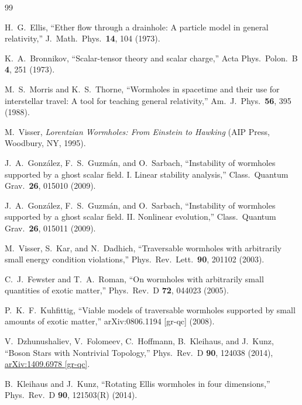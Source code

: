 \documentclass[twocolumn,floatfix,aps,prd,superscriptaddress,nofootinbib]{revtex4-2}
\begin{document}
\begin{thebibliography}{99}

H.~G.~Ellis,
\newblock ``Ether flow through a drainhole: A particle model in general relativity,''
\newblock J.\ Math.\ Phys.\ \textbf{14}, 104 (1973).

K.~A.~Bronnikov,
\newblock ``Scalar-tensor theory and scalar charge,''
\newblock Acta Phys.\ Polon.\ B \textbf{4}, 251 (1973).

M.~S.~Morris and K.~S.~Thorne,
\newblock ``Wormholes in spacetime and their use for interstellar travel: A tool for teaching general relativity,''
\newblock Am.\ J.\ Phys.\ \textbf{56}, 395 (1988).

M.~Visser,
\newblock \emph{Lorentzian Wormholes: From Einstein to Hawking}
\newblock (AIP Press, Woodbury, NY, 1995).

J.~A.~Gonz\'alez, F.~S.~Guzm\'an, and O.~Sarbach,
\newblock ``Instability of wormholes supported by a ghost scalar field. I. Linear stability analysis,''
\newblock Class.\ Quantum Grav.\ \textbf{26}, 015010 (2009).

J.~A.~Gonz\'alez, F.~S.~Guzm\'an, and O.~Sarbach,
\newblock ``Instability of wormholes supported by a ghost scalar field. II. Nonlinear evolution,''
\newblock Class.\ Quantum Grav.\ \textbf{26}, 015011 (2009).

M.~Visser, S.~Kar, and N.~Dadhich,
\newblock ``Traversable wormholes with arbitrarily small energy condition violations,''
\newblock Phys.\ Rev.\ Lett.\ \textbf{90}, 201102 (2003).

C.~J.~Fewster and T.~A.~Roman,
\newblock ``On wormholes with arbitrarily small quantities of exotic matter,''
\newblock Phys.\ Rev.\ D \textbf{72}, 044023 (2005).

P.~K.~F.~Kuhfittig,
\newblock ``Viable models of traversable wormholes supported by small amounts of exotic matter,''
\newblock arXiv:0806.1194 [gr-qc] (2008).

V.~Dzhunushaliev, V.~Folomeev, C.~Hoffmann, B.~Kleihaus, and J.~Kunz,
\newblock ``Boson Stars with Nontrivial Topology,''
\newblock Phys.\ Rev.\ D \textbf{90}, 124038 (2014),
\newblock \href{https://arxiv.org/abs/1409.6978}{arXiv:1409.6978 [gr-qc]}.

B.~Kleihaus and J.~Kunz,
\newblock ``Rotating Ellis wormholes in four dimensions,''
\newblock Phys.\ Rev.\ D \textbf{90}, 121503(R) (2014).


\end{thebibliography}
\end{document}
